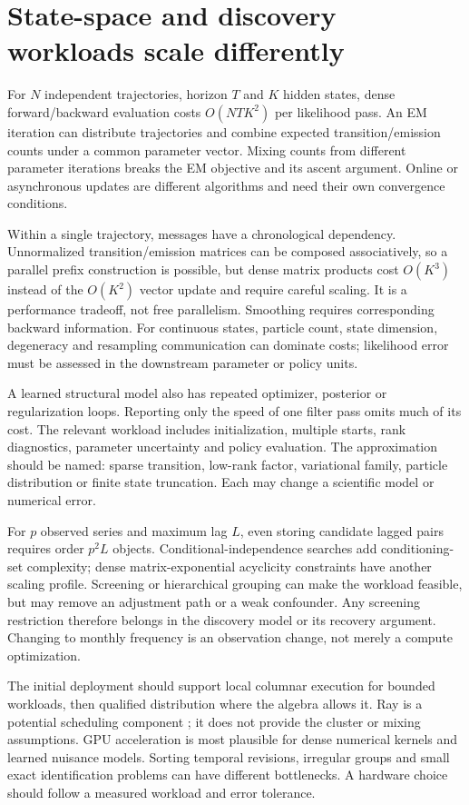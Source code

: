 \section{State-space and discovery workloads scale differently}
\label{r3:dynamic-scale}

For $N$ independent trajectories, horizon $T$ and $K$ hidden states,
dense forward/backward evaluation costs $O(NTK^2)$ per likelihood pass.
An EM iteration can distribute trajectories and combine expected
transition/emission counts under a common parameter vector. Mixing counts
from different parameter iterations breaks the EM objective and its
ascent argument. Online or asynchronous updates are different algorithms
and need their own convergence conditions.

Within a single trajectory, messages have a chronological dependency.
Unnormalized transition/emission matrices can be composed associatively,
so a parallel prefix construction is possible, but dense matrix products
cost $O(K^3)$ instead of the $O(K^2)$ vector update and require careful
scaling. It is a performance tradeoff, not free parallelism. Smoothing
requires corresponding backward information. For continuous states,
particle count, state dimension, degeneracy and resampling communication
can dominate costs; likelihood error must be assessed in the downstream
parameter or policy units.

A learned structural model also has repeated optimizer, posterior or
regularization loops. Reporting only the speed of one filter pass
omits much of its cost. The relevant workload includes initialization,
multiple starts, rank diagnostics, parameter uncertainty and policy
evaluation. The approximation should be named: sparse transition,
low-rank factor, variational family, particle distribution or finite
state truncation. Each may change a scientific model or numerical error.

For $p$ observed series and maximum lag $L$, even storing candidate
lagged pairs requires order $p^2L$ objects. Conditional-independence
searches add conditioning-set complexity; dense matrix-exponential
acyclicity constraints have another scaling profile. Screening or
hierarchical grouping can make the workload feasible, but may remove
an adjustment path or a weak confounder. Any screening restriction
therefore belongs in the discovery model or its recovery argument.
Changing to monthly frequency is an observation change, not merely
a compute optimization.

The initial deployment should support local columnar execution for
bounded workloads, then qualified distribution where the algebra allows
it. Ray is a potential scheduling component \citep{sw_ray}; it does not
provide the cluster or mixing assumptions. GPU acceleration is most
plausible for dense numerical kernels and learned nuisance models.
Sorting temporal revisions, irregular groups and small exact
identification problems can have different bottlenecks. A hardware
choice should follow a measured workload and error tolerance.

